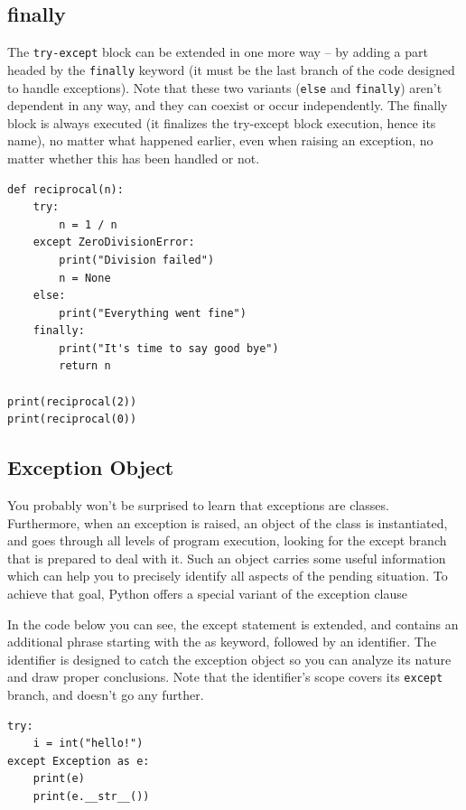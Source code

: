 \documentclass[11pt]{article}
\begin{document}
\subsection{finally}
\label{sec:orgf5cc80c}
The \texttt{try-except} block can be extended in one more way – by adding a
part headed by the \texttt{finally} keyword (it must be the last branch of
the code designed to handle exceptions). Note that these two variants
(\texttt{else} and \texttt{finally}) aren’t dependent in any way, and they can
coexist or occur independently. The finally block is always executed
(it finalizes the try-except block execution, hence its name), no
matter what happened earlier, even when raising an exception, no
matter whether this has been handled or not.

\begin{verbatim}
def reciprocal(n):
	try:
		n = 1 / n
	except ZeroDivisionError:
		print("Division failed")
		n = None
	else:
		print("Everything went fine")
	finally:
		print("It's time to say good bye")
		return n

print(reciprocal(2))
print(reciprocal(0))
\end{verbatim}

\subsection{Exception Object}
\label{sec:orgeea373d}
You probably won’t be surprised to learn that exceptions are
classes. Furthermore, when an exception is raised, an object of the
class is instantiated, and goes through all levels of program
execution, looking for the except branch that is prepared to deal with
it.  Such an object carries some useful information which can help you
to precisely identify all aspects of the pending situation. To achieve
that goal, Python offers a special variant of the exception clause

In the code below you can see, the except statement is extended, and
contains an additional phrase starting with the as keyword, followed
by an identifier. The identifier is designed to catch the exception
object so you can analyze its nature and draw proper conclusions. Note
that the identifier’s scope covers its \texttt{except} branch, and doesn’t go
any further.

\begin{verbatim}
try:
	i = int("hello!")
except Exception as e:
	print(e)
	print(e.__str__())

\end{verbatim}
\end{document}
